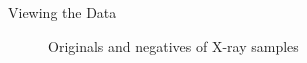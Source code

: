 \documentclass[9pt]{beamer}
\begin{document}
\begin{frame}{Viewing the Data}
    \begin{figure}[h]%
    \centering
    \qquad
    \qquad
    \caption{Originals and negatives of X-ray samples}
    \end{figure}
\end{frame} 
\end{document}
